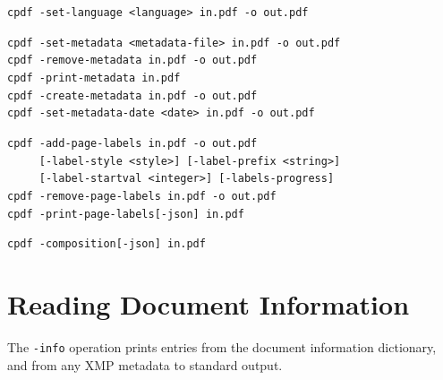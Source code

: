 \documentclass{book}
\begin{document}
\begin{framed}
    \vspace{1.5mm}
    \small\noindent\verb!cpdf -set-language <language> in.pdf -o out.pdf!

    \vspace{1.5mm}
    \small\noindent\verb!cpdf -set-metadata <metadata-file> in.pdf -o out.pdf!\\
    \small\noindent\verb!cpdf -remove-metadata in.pdf -o out.pdf!\\
    \small\noindent\verb!cpdf -print-metadata in.pdf!\\
    \small\noindent\verb!cpdf -create-metadata in.pdf -o out.pdf!\\
    \small\noindent\verb!cpdf -set-metadata-date <date> in.pdf -o out.pdf!
    
    \vspace{1.5mm}
    \small\noindent\verb!cpdf -add-page-labels in.pdf -o out.pdf!\\
    \noindent\verb!     [-label-style <style>] [-label-prefix <string>]!\\
    \noindent\verb!     [-label-startval <integer>] [-labels-progress]!\\
    
    \vspace{1.5mm}
    \small\noindent\verb!cpdf -remove-page-labels in.pdf -o out.pdf!\\
    \small\noindent\verb!cpdf -print-page-labels[-json] in.pdf!

    \vspace{1.5mm}
    \small\noindent\verb!cpdf -composition[-json] in.pdf!
  \end{framed}
 
\section{Reading Document Information}
\label{info}
The \texttt{-info} operation prints entries from the document information
dictionary, and from any XMP metadata to standard output.
\end{document}
